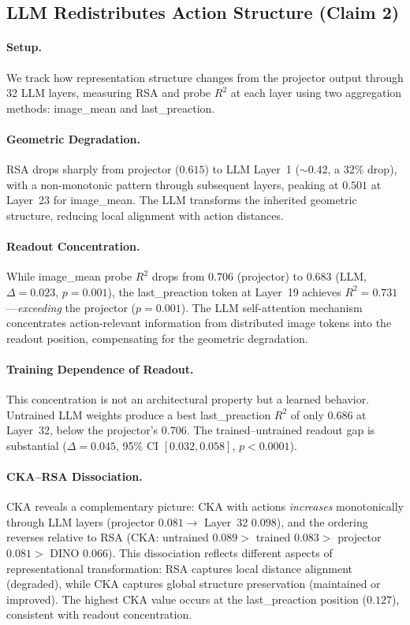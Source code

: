 \documentclass[letterpaper]{article}
\begin{document}
\subsection{LLM Redistributes Action Structure (Claim 2)}
\label{sec:exp-llm}

\paragraph{Setup.}
We track how representation structure changes from the projector output through 32 LLM layers, measuring RSA and probe $R^2$ at each layer using two aggregation methods: image\_mean and last\_preaction.

\paragraph{Geometric Degradation.}
RSA drops sharply from projector ($0.615$) to LLM Layer~1 ($\sim$0.42, a 32\% drop), with a non-monotonic pattern through subsequent layers, peaking at $0.501$ at Layer~23 for image\_mean.
The LLM transforms the inherited geometric structure, reducing local alignment with action distances.

\paragraph{Readout Concentration.}
While image\_mean probe $R^2$ drops from $0.706$ (projector) to $0.683$ (LLM, $\Delta{=}0.023$, $p{=}0.001$), the last\_preaction token at Layer~19 achieves $R^2{=}0.731$---\emph{exceeding} the projector ($p{=}0.001$).
The LLM self-attention mechanism concentrates action-relevant information from distributed image tokens into the readout position, compensating for the geometric degradation.

\paragraph{Training Dependence of Readout.}
This concentration is not an architectural property but a learned behavior.
Untrained LLM weights produce a best last\_preaction $R^2$ of only $0.686$ at Layer~32, below the projector's $0.706$.
The trained--untrained readout gap is substantial ($\Delta{=}0.045$, 95\% CI $[0.032, 0.058]$, $p{<}0.0001$).

\paragraph{CKA--RSA Dissociation.}
CKA reveals a complementary picture: CKA with actions \emph{increases} monotonically through LLM layers (projector $0.081 \to$ Layer~32 $0.098$), and the ordering reverses relative to RSA (CKA: untrained $0.089 >$ trained $0.083 >$ projector $0.081 >$ DINO $0.066$).
This dissociation reflects different aspects of representational transformation: RSA captures local distance alignment (degraded), while CKA captures global structure preservation (maintained or improved).
The highest CKA value occurs at the last\_preaction position ($0.127$), consistent with readout concentration.
\end{document}
